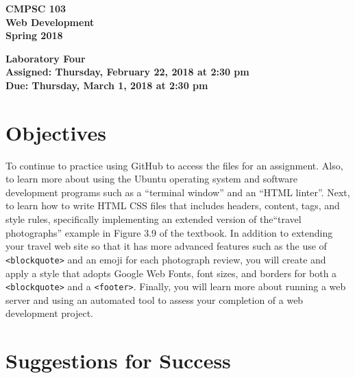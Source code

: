 \documentclass[11pt]{article}
\newcommand{\assignmentduedate}{March 1}
\newcommand{\assignmentassignedate}{February 22}
\newcommand{\assignmentnumber}{Four}
\newcommand{\labyear}{2018}
\newcommand{\labday}{Thursday}
\newcommand{\labtime}{2:30 pm}
\newcommand{\assigneddate}{Assigned: \labday, \assignmentassignedate, \labyear{} at \labtime{}}
\newcommand{\duedate}{Due: \labday, \assignmentduedate, \labyear{} at \labtime{}}
\newcommand{\program}[1]{\lstinline{#1}}
\newcommand{\labtitle}[1]
{
  \begin{center}
    \begin{center}
      \bf
      CMPSC 103\\Web Development\\
      Spring 2018\\
      \medskip
    \end{center}
    \bf
    #1
  \end{center}
}
\begin{document}
\thispagestyle{empty}

\labtitle{Laboratory \assignmentnumber{} \\ \assigneddate{} \\ \duedate{}}

\section*{Objectives}

To continue to practice using GitHub to access the files for an assignment.
Also, to learn more about using the Ubuntu operating system and software
development programs such as a ``terminal window'' and an ``HTML linter''. Next,
to learn how to write HTML CSS files that includes headers, content, tags, and
style rules, specifically implementing an extended version of the``travel
photographs'' example in Figure 3.9 of the textbook. In addition to extending
your travel web site so that it has more advanced features such as the use of
\program{<blockquote>} and an emoji for each photograph review, you will create
and apply a style that adopts Google Web Fonts, font sizes, and borders for both
a \program{<blockquote>} and a \program{<footer>}. Finally, you will learn more
about running a web server and using an automated tool to assess your completion
of a web development project.

\section*{Suggestions for Success}
\end{document}
